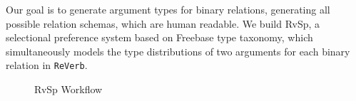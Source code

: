 Our goal is to generate argument types for binary relations, generating all possible
relation schemas, which are human readable.
We build RvSp, a selectional preference system based on Freebase type taxonomy, which simultaneously models the
type distributions of two arguments for each binary relation in {\tt ReVerb}.

\begin{figure}[htp]
\centering {}
\caption{RvSp Workflow}
\label{fig:workflow}
\end{figure}


